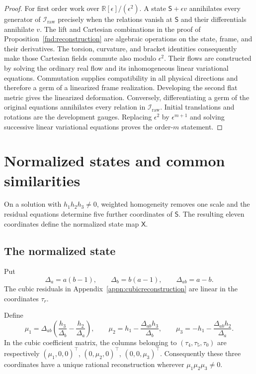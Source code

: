 \documentclass[11pt,a4paper]{article}
\numberwithin{equation}{section}
\theoremstyle{plain}
\theoremstyle{definition}
\theoremstyle{remark}
\begin{document}
\begin{proof}
For first order work over $\mathbb R[\epsilon]/(\epsilon^2)$.
A state $\mathsf S+\epsilon v$ annihilates every generator of $\mathscr I_{\mathrm{raw}}$ precisely when
the relations vanish at $\mathsf S$ and their differentials annihilate $v$.
The lift and Cartesian combinations in the proof of
Proposition~\ref{fnd:reconstruction} are algebraic operations on the
state, frame, and their derivatives.  The torsion, curvature, and
bracket identities consequently make those Cartesian fields commute
also modulo $\epsilon^2$.  Their flows are constructed by solving the
ordinary real flow and its inhomogeneous linear variational equations.
Commutation supplies compatibility in all physical directions and
therefore a germ of a linearized frame realization.  Developing the
second flat metric gives the linearized deformation.  Conversely,
differentiating a germ of the original equations annihilates every
relation in $\mathscr I_{\mathrm{raw}}$. Initial translations and rotations are
the development gauges. Replacing $\epsilon^2$ by $\epsilon^{m+1}$ and
solving successive linear variational equations proves the order-$m$
statement.
\end{proof}

\section{Normalized states and common similarities}\label{fnd:secnormalization}\label{sec:normalization}

On a solution with $h_1h_2h_3\ne0$, weighted homogeneity removes one
scale and the residual equations determine five further coordinates of
$\mathsf S$. The resulting eleven coordinates define the normalized
state map $\mathsf X$.

\subsection{The normalized state}
Put
\[
\Delta_a=a(b-1),\qquad \Delta_b=b(a-1),\qquad \Delta_{ab}=a-b.
\]
The cubic residuals in Appendix~\ref{appn:cubicreconstruction} are linear in the coordinates $\tau_r$.

Define
\begin{equation}\label{fnd:mu}
\mu_1=\Delta_{ab}\left(\frac{h_3}{\Delta_b}-\frac{h_2}{\Delta_a}\right),\qquad
\mu_2=h_1-\frac{\Delta_{ab}h_3}{\Delta_b},\qquad
\mu_3=-h_1-\frac{\Delta_{ab}h_2}{\Delta_a}.
\end{equation}
In the cubic coefficient matrix, the columns belonging to $(\tau_4,\tau_5,\tau_0)$ are respectively $(\mu_1,0,0)^{\top}$, $(0,\mu_2,0)^{\top}$, $(0,0,\mu_3)^{\top}$. Consequently these three coordinates have a unique rational reconstruction wherever $\mu_1\mu_2\mu_3\ne0$.
\end{document}
